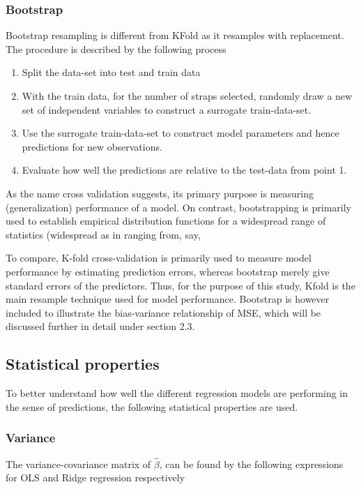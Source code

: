 \documentclass[...,numrefs]{wiley-article}
\begin{document}
\subsubsection{Bootstrap}
Bootstrap resampling is different from KFold as it resamples with replacement. The procedure is described by the following process

\begin{enumerate}
    \item Split the data-set into test and train data
    \item With the train data, for the number of straps selected, randomly draw a new set of independent variables to construct a surrogate train-data-set.  
    \item Use the surrogate train-data-set to construct model parameters and hence predictions for new observations.
    \item  Evaluate how well the predictions are relative to the test-data from point 1.  
\end{enumerate}

As the name cross validation suggests, its primary purpose is measuring (generalization) performance of a model. On contrast, bootstrapping is primarily used to establish empirical distribution functions for a widespread range of statistics (widespread as in ranging from, say,\newline
\newline

\noindent To compare, K-fold cross-validation is primarily used to measure model performance by estimating prediction errors, whereas bootstrap merely give standard errors of the predictors. Thus, for the purpose of this study, Kfold is the main resample technique used for model performance. Bootstrap is however included to illustrate the bias-variance relationship of MSE, which will be discussed further in detail under section 2.3.

\subsection{Statistical properties}

To better understand how well the different regression models are performing in the sense of predictions, the following statistical properties are used. 

\subsubsection{Variance}
The variance-covariance matrix of $\hat{\beta}$, can be found by the following expressions for OLS and Ridge regression respectively
\end{document}
